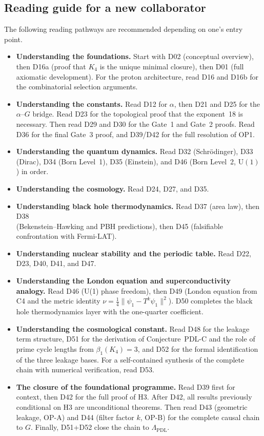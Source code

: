 \documentclass[11pt,a4paper]{article}
\theoremstyle{plain}
\theoremstyle{definition}
\theoremstyle{remark}
\begin{document}
\subsection{Reading guide for a new collaborator}
\label{subsec:readingguide}
The following reading pathways are recommended depending on one's entry point.

\begin{itemize}
\item \textbf{Understanding the foundations.} Start with D02 (conceptual overview), then D16a (proof that $K_4$ is the unique minimal closure), then D01 (full axiomatic development). For the proton architecture, read D16 and D16b for the combinatorial selection arguments.
\item \textbf{Understanding the constants.} Read D12 for $\alpha$, then D21 and D25 for the $\alpha$--$G$ bridge. Read D23 for the topological proof that the exponent~18 is necessary. Then read D29 and D30 for the Gate~1 and Gate~2 proofs. Read D36 for the final Gate~3 proof, and D39/D42 for the full resolution of OP1.
\item \textbf{Understanding the quantum dynamics.} Read D32 (Schr\"odinger), D33 (Dirac), D34 (Born Level~1), D35 (Einstein), and D46 (Born Level~2, $\mathrm{U}(1)$) in order.
\item \textbf{Understanding the cosmology.} Read D24, D27, and D35.
\item \textbf{Understanding black hole thermodynamics.} Read D37 (area law), then D38 \\ (Bekenstein--Hawking and PBH predictions), then D45 (falsifiable confrontation with Fermi-LAT).
\item \textbf{Understanding nuclear stability and the periodic table.} Read D22, D23, D40, D41, and D47.
\item \textbf{Understanding the London equation and superconductivity analogy.} Read D46 (U(1) phase freedom), then D49 (London equation from C4 and the metric identity $\nu = \tfrac{1}{4}\|\psi_1 - T^k\psi_1\|^2$). D50 completes the black hole thermodynamics layer with the one-quarter coefficient.
\item \textbf{Understanding the cosmological constant.} Read D48 for the leakage term structure, D51 for the derivation of Conjecture~PDL-C and the role of prime cycle lengths from $\beta_1(K_4)=3$, and D52 for the formal identification of the three leakage bases. For a self-contained synthesis of the complete chain with numerical verification, read D53.
\item \textbf{The closure of the foundational programme.} Read D39 first for context, then D42 for the full proof of H3. After D42, all results previously conditional on H3 are unconditional theorems. Then read D43 (geometric leakage, OP-A) and D44 (filter factor $k$, OP-B) for the complete causal chain to $G$. Finally, D51+D52 close the chain to $\Lambda_{\mathrm{PDL}}$.

\end{itemize}
\end{document}
